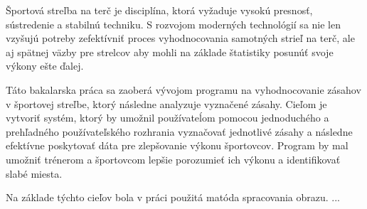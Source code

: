 Športová streľba na terč je disciplína, ktorá vyžaduje vysokú presnosť, sústredenie a stabilnú techniku. 
S rozvojom moderných technológií sa nie len vzyšujú potreby zefektívniť proces vyhodnocovania samotných 
strieľ na terč, ale aj spätnej väzby pre strelcov aby mohli na základe štatistiky posunúť svoje výkony 
ešte ďalej.

Táto bakalarska práca sa zaoberá vývojom programu na vyhodnocovanie zásahov v športovej streľbe, ktorý 
následne analyzuje vyznačené zásahy. Cieľom je vytvoriť systém, ktorý by umožnil používateĺom pomocou 
jednoduchého a prehľadného používateľského rozhrania vyznačovať jednotlivé zásahy a následne efektívne 
poskytovať dáta pre zlepšovanie výkonu športovcov. Program by mal umožniť trénerom a športovcom lepšie 
porozumieť ich výkonu a identifikovať slabé miesta.

Na základe týchto cieľov bola v práci použitá matóda spracovania obrazu. ...
